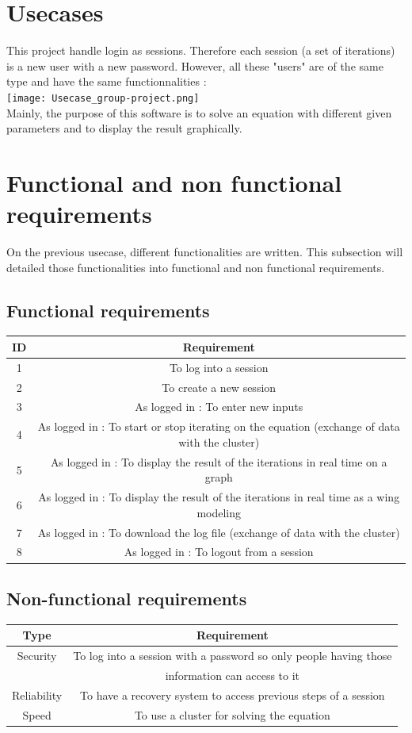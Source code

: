\documentclass[10pt,a4paper]{report}
\begin{document}
	\section{Usecases}
This project handle login as sessions. Therefore each session (a set of iterations) is a new user with a new password.  However, all these "users" are of the same type and have the same functionnalities : \\
\texttt{[image: Usecase\_group-project.png]}\\

Mainly, the purpose of this software is to solve an equation with different given parameters and to display the result graphically.
	\section{Functional and non functional requirements}
On the previous usecase, different functionalities are written. This subsection will detailed those functionalities into functional and non functional requirements.
		\subsection{Functional requirements}
\begin{tabular}{|c|c|}
\hline 
\textbf{ID} & \textbf{Requirement} \\ 
\hline 
1 & To log into a session \\ 
\hline 
2 & To create a new session \\ 
\hline 
3 & As logged in : To enter new inputs \\ 
\hline
4 & As logged in : To start or stop iterating on the equation (exchange of data with the cluster) \\ 
\hline
5 & As logged in : To display the result of the iterations in real time on a graph \\ 
\hline
6 & As logged in : To display the result of the iterations in real time as a wing modeling \\ 
\hline
7 & As logged in : To download the log file (exchange of data with the cluster)\\ 
\hline
8 & As logged in : To logout from a session \\ 
\hline
\end{tabular} 
		\subsection{Non-functional requirements}
\begin{tabular}{|c|c|}
\hline 
\textbf{Type} & \textbf{Requirement} \\ 
\hline 
Security & To log into a session with a password so only people having those\\
 & information can access to it\\ 
\hline 
Reliability & To have a recovery system to access previous steps of a session \\ 
\hline 
Speed & To use a cluster for solving the equation \\ 
\hline
\end{tabular} 
\end{document}
